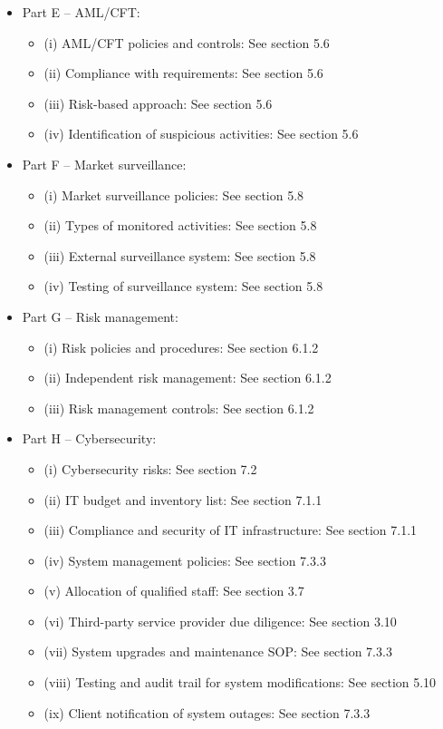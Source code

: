 \documentclass[]{report}
\begin{document}
\begin{itemize}
\item Part E – AML/CFT:
  \begin{itemize}
\item (i) AML/CFT policies and controls: See section 5.6
\item (ii) Compliance with requirements: See section 5.6
\item (iii) Risk-based approach: See section 5.6
\item (iv) Identification of suspicious activities: See section 5.6
\end{itemize}
\item Part F – Market surveillance:
  \begin{itemize}
\item (i) Market surveillance policies: See section 5.8
\item (ii) Types of monitored activities: See section 5.8
\item (iii) External surveillance system: See section 5.8
\item (iv) Testing of surveillance system: See section 5.8
\end{itemize}
\item Part G – Risk management:
    \begin{itemize}
\item (i) Risk policies and procedures: See section 6.1.2
\item (ii) Independent risk management: See section 6.1.2
\item (iii) Risk management controls: See section 6.1.2
\end{itemize}
\item Part H – Cybersecurity:
  \begin{itemize}
\item (i) Cybersecurity risks: See section 7.2
\item (ii) IT budget and inventory list: See section 7.1.1
\item (iii) Compliance and security of IT infrastructure: See section 7.1.1
\item (iv) System management policies: See section 7.3.3
\item (v) Allocation of qualified staff: See section 3.7
\item (vi) Third-party service provider due diligence: See section 3.10
\item (vii) System upgrades and maintenance SOP: See section 7.3.3
\item (viii) Testing and audit trail for system modifications: See section 5.10
\item (ix) Client notification of system outages: See section 7.3.3

\end{itemize}
\end{itemize}
\end{document}
